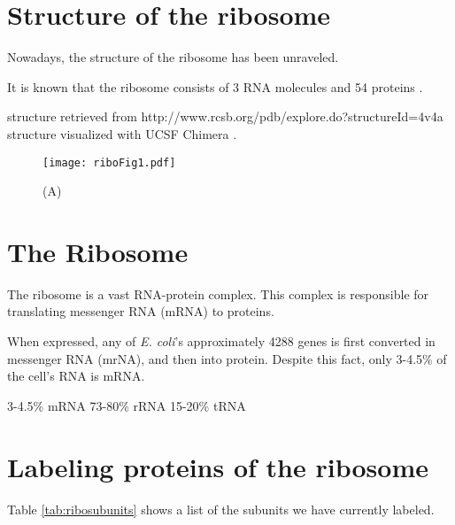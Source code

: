 \section{Structure of the ribosome}

Nowadays, the structure of the ribosome has been unraveled.

It is known that the ribosome consists of 3 RNA molecules and 54 proteins \cite{Chen2012}.%

structure retrieved from
http://www.rcsb.org/pdb/explore.do?structureId=4v4a
structure visualized with UCSF Chimera \cite{pettersen2004}.



% 

\begin{figure}
    \centering
    \texttt{[image: riboFig1.pdf]}
    \caption{ 
        (A)  
    }
    \label{fig:modeldrawing}
\end{figure}


\section{The Ribosome}





The ribosome is a vast RNA-protein complex. 
This complex is responsible for translating messenger RNA (mRNA) to proteins.


When expressed, any of \textit{E. coli}'s approximately 4288 genes \cite{Blattner1997} is first converted in messenger RNA (mrNA), and then into protein.
Despite this fact, only 3-4.5\% of the cell's RNA is mRNA.


3-4.5\% mRNA
73-80\% rRNA
15-20\% tRNA

\cite{Norris1972}


\section{Labeling proteins of the ribosome}

Table \ref{tab:ribosubunits} shows a list of the subunits we have currently labeled.

